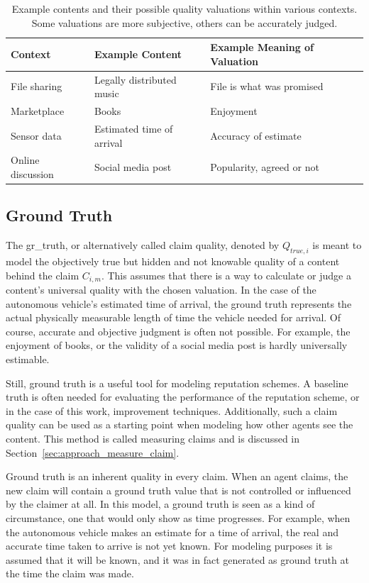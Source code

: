 \documentclass[%
    ]{\PathToTumTemplate/thesis/tum_thesis}
\begin{document}
\begin{table}[tbp]
\centering
\begin{tabular}{lll}
\toprule
\textbf{Context}        & \textbf{Example Content} & \textbf{Example Meaning of Valuation} \\ \midrule
File sharing       & Legally distributed music & File is what was promised \\
Marketplace        & Books & Enjoyment \\
Sensor data     & Estimated time of arrival & Accuracy of estimate \\
Online discussion   & Social media post & Popularity, agreed or not \\
\bottomrule
\end{tabular}
\caption{
	Example contents and their possible quality valuations within various contexts.
	Some valuations are more subjective, others can be accurately judged.
}
\label{tab:content_examples}
\end{table}


\subsection{Ground Truth}\label{sec:approach_gr_truth}
The \gls{gr_truth}, or alternatively called claim quality, denoted by $ Q_{true,i} $ is meant to model the objectively true but hidden and not knowable quality of a content behind the claim $ C_{i,m} $.
This assumes that there is a way to calculate or judge a content's universal quality with the chosen valuation.
In the case of the autonomous vehicle's estimated time of arrival, the ground truth represents the actual physically measurable length of time the vehicle needed for arrival.
Of course, accurate and objective judgment is often not possible.
For example, the enjoyment of books, or the validity of a social media post is hardly universally estimable.

Still, ground truth is a useful tool for modeling reputation schemes.
A baseline truth is often needed for evaluating the performance of the reputation scheme, or in the case of this work, improvement techniques.
Additionally, such a claim quality can be used as a starting point when modeling how other agents see the content.
This method is called measuring claims and is discussed in Section~\ref{sec:approach_measure_claim}.

Ground truth is an inherent quality in every claim.
When an agent claims, the new claim will contain a ground truth value that is not controlled or influenced by the claimer at all.
In this model, a ground truth is seen as a kind of circumstance, one that would only show as time progresses.
For example, when the autonomous vehicle makes an estimate for a time of arrival, the real and accurate time taken to arrive is not yet known.
For modeling purposes it is assumed that it will be known, and it was in fact generated as ground truth at the time the claim was made.
\end{document}
